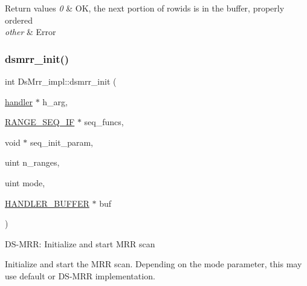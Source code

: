 \begin{DoxyRetVals}{Return values}
{\em 0} & OK, the next portion of rowids is in the buffer, properly ordered \\
\hline
{\em other} & Error \\
\hline
\end{DoxyRetVals}
\mbox{\label{classDsMrr__impl_ade7283d68a19de82fd19ad836ac10506}} 
\subsubsection{\texorpdfstring{dsmrr\+\_\+init()}{dsmrr\_init()}}
{\footnotesize\ttfamily int Ds\+Mrr\+\_\+impl\+::dsmrr\+\_\+init (\begin{DoxyParamCaption}\item[{\mbox{\hyperlink{classhandler}{handler}} $\ast$}]{h\+\_\+arg,  }\item[{\mbox{\hyperlink{structst__range__seq__if}{R\+A\+N\+G\+E\+\_\+\+S\+E\+Q\+\_\+\+IF}} $\ast$}]{seq\+\_\+funcs,  }\item[{void $\ast$}]{seq\+\_\+init\+\_\+param,  }\item[{uint}]{n\+\_\+ranges,  }\item[{uint}]{mode,  }\item[{\mbox{\hyperlink{structst__handler__buffer}{H\+A\+N\+D\+L\+E\+R\+\_\+\+B\+U\+F\+F\+ER}} $\ast$}]{buf }\end{DoxyParamCaption})}

DS-\/M\+RR\+: Initialize and start M\+RR scan

Initialize and start the M\+RR scan. Depending on the mode parameter, this may use default or DS-\/M\+RR implementation.


